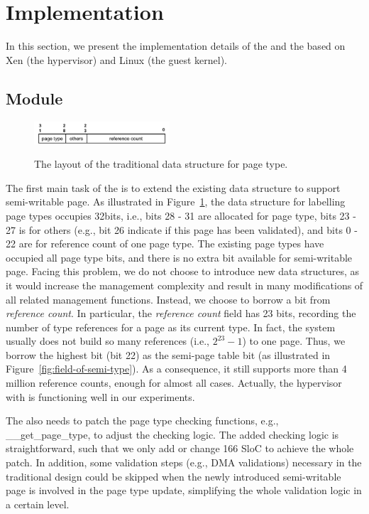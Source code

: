 \section{Implementation} \label{sec:impl}
In this section, we present the implementation details of the \module and the \cache based on Xen (the hypervisor) and Linux (the guest kernel).

\subsection{\name Module}
\begin{figure}[ht]
\centering
\includegraphics[width=0.45\textwidth]{image/implementation/field-of-page-type-info.jpg} \\
\caption{The layout of the traditional data structure for page type.}
\label{fig:field-of-page-type-info}
\end{figure}
The first main task of the \module is to extend the existing data structure to support semi-writable page.
As illustrated in Figure~\ref{fig:field-of-page-type-info}, the data structure for labelling page types occupies 32bits, i.e., bits 28 - 31 are allocated for page type, bits 23 - 27 is for others (e.g., bit 26 indicate if this page has been validated), and bits 0 - 22 are for reference count of one page type.
The existing page types have occupied all page type bits, and there is no extra bit available for semi-writable page.
Facing this problem, we do not choose to introduce new data structures, as it would increase the management complexity and result in many modifications of all related management functions.
Instead, we choose to borrow a bit from \emph{reference count}.
In particular, the \emph{reference count} field has 23 bits, recording the number of type references for a page as its current type.
In fact, the system usually does not build so many references (i.e., $2^{23}-1$) to one page. Thus, we borrow the highest bit (bit 22) as the semi-page table bit (as illustrated in Figure~\ref{fig:field-of-semi-type}).
As a consequence, it still supports more than 4 million reference counts, enough for almost all cases.
Actually, the hypervisor with \name is functioning well in our experiments.

The \module also needs to patch the page type checking functions, e.g., \_\_get\_page\_type, to adjust the checking logic.
The added checking logic is straightforward, such that we only add or change 166 SloC to achieve the whole patch.
In addition, some validation steps (e.g., DMA validations) necessary in the traditional design could be skipped when the newly introduced semi-writable page is involved in the page type update, simplifying the whole validation logic in a certain level.

